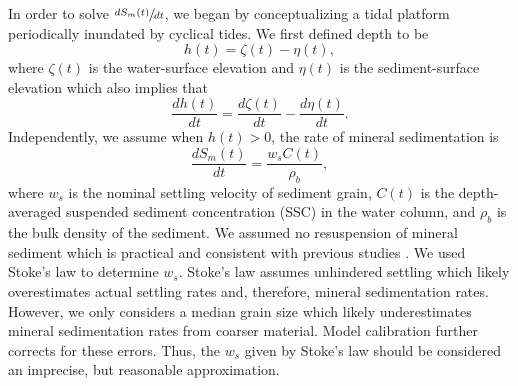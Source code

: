 In order to solve $\sfrac{dS_m(t)}{dt}$, we began by conceptualizing a tidal platform periodically inundated by cyclical tides. We first defined depth to be
\begin{equation}\label{eq:depth}
	h(t) = \zeta(t) - \eta(t),
\end{equation}
where $\zeta(t)$ is the water-surface elevation and $\eta(t)$ is the sediment-surface elevation which also implies that
\begin{equation}\label{eq:depth_dt}
	\frac{dh(t)}{dt} = \frac{d\zeta(t)}{dt} - \frac{d\eta(t)}{dt}.
\end{equation}
Independently, we assume when $h(t) > 0$, the rate of mineral sedimentation is
\begin{equation}\label{eq:sed_flux}
	\frac{dS_m(t)}{dt} = \frac{w_sC(t)}{\rho_b},
\end{equation}
where $w_s$ is the nominal settling velocity of sediment grain, $C(t)$ is the depth-averaged suspended sediment concentration (SSC) in the water column, and $\rho_b$ is the bulk density of the sediment. We assumed no resuspension of mineral sediment which is practical and consistent with previous studies \citep{kroneMethodSimulatingMarsh1987, allenSaltmarshGrowthStratification1990, frenchNumericalSimulationVertical1993, temmermanModellingLongtermTidal2003, temmermanModellingEstuarineVariations2004}. We used Stoke's law to determine $w_s$. Stoke's law assumes unhindered settling which likely overestimates actual settling rates and, therefore, mineral sedimentation rates. However, we only considers a median grain size which likely underestimates mineral sedimentation rates from coarser material. Model calibration further corrects for these errors. Thus, the $w_s$ given by Stoke's law should be considered an imprecise, but reasonable approximation.

